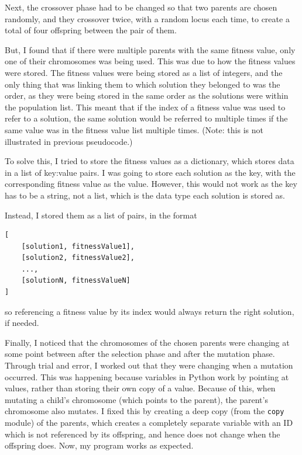 \documentclass[a4paper, 12pt]{report}
\begin{document}
Next, the crossover phase had to be changed so that two parents are chosen
randomly, and they crossover twice, with a random locus each time, to create a 
total of four offspring between the pair of them.

But, I found that if there were multiple parents with the same fitness value,
only one of their chromosomes was being used.
This was due to how the fitness values were stored.
The fitness values were being stored as a list of integers, and the only thing 
that was linking them to which solution they belonged to was the order, as they
were being stored in the same order as the solutions were within the population
list.
This meant that if the index of a fitness value was used to refer to a solution,
the same solution would be referred to multiple times if the same value was in
the fitness value list multiple times. (Note: this is not illustrated in 
previous pseudocode.)

To solve this, I tried to store the fitness values as a dictionary, which stores
data in a list of key:value pairs.
I was going to store each solution as the key, with the corresponding fitness
value as the value.
However, this would not work as the key has to be a string, not a list, which is
the data type each solution is stored as.

Instead, I stored them as a list of pairs, in the format
\begin{Verbatim}[tabsize=4]
[
	[solution1, fitnessValue1],
	[solution2, fitnessValue2],
	...,
	[solutionN, fitnessValueN]
]
\end{Verbatim}
so referencing a fitness value by its index would always return the right 
solution, if needed.

Finally, I noticed that the chromosomes of the chosen parents were changing at
some point between after the selection phase and after the mutation phase.
Through trial and error, I worked out that they were changing when a mutation
occurred. 
This was happening because variables in Python work by pointing at values, 
rather than storing their own copy of a value.
Because of this, when mutating a child's chromosome (which points to the 
parent), the parent's chromosome also mutates.
I fixed this by creating a deep copy (from the \verb|copy| module) of the 
parents, which creates a completely separate variable with an ID which is not
referenced by its offspring, and hence does not change when the offspring does.
Now, my program works as expected.

\end{document}
